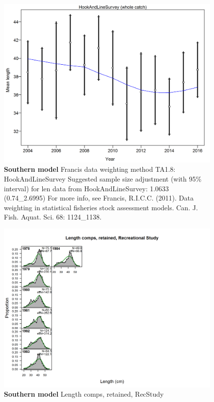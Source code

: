 \documentclass[12pt,]{article}
\begin{document}
\begin{figure}[htbp]
\centering
\includegraphics{./r4ss/plots_mod2/comp_lenfit_data_weighting_TA1.8_HookAndLineSurvey.png}
\caption{\textbf{Southern model} Francis data weighting method TA1.8:
HookAndLineSurvey Suggested sample size adjustment (with 95\% interval)
for len data from HookAndLineSurvey: 1.0633 (0.74\_2.6995) For more
info, see Francis, R.I.C.C. (2011). Data weighting in statistical
fisheries stock assessment models. Can. J. Fish. Aquat. Sci. 68:
1124\_1138.
\label{fig:mod2_16_comp_lenfit_data_weighting_TA1.8_HookAndLineSurvey}}
\end{figure}

\begin{figure}[htbp]
\centering
\includegraphics{./r4ss/plots_mod2/comp_lenfit_flt5mkt2.png}
\caption{\textbf{Southern model} Length comps, retained, RecStudy
\label{fig:mod2_17_comp_lenfit_flt5mkt2}}
\end{figure}
\end{document}
